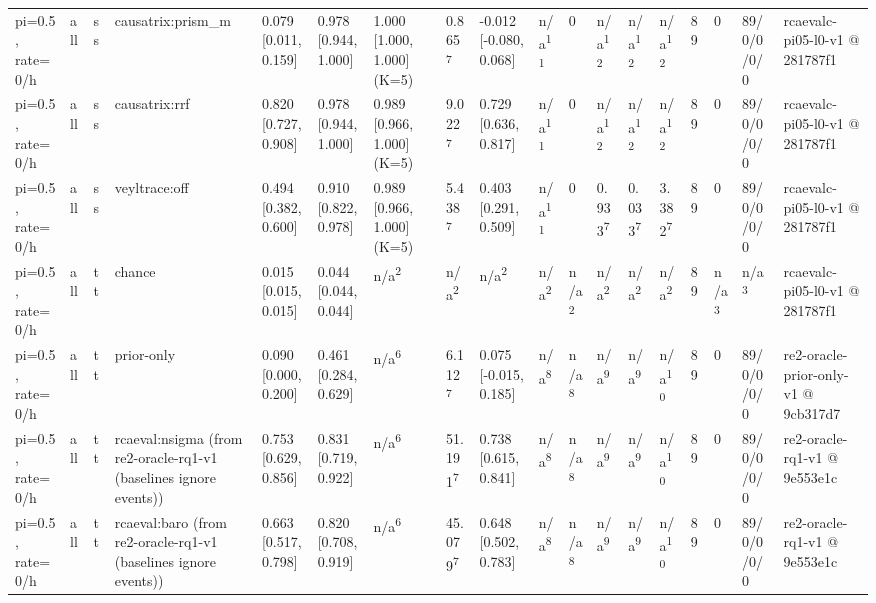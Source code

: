 \begin{table}[t]
\begin{tabular}{llllllllllllllllll}
pi=0.5, rate=0/h & all & ss & causatrix:prism\_m & 0.079 [0.011, 0.159] & 0.978 [0.944, 1.000] & 1.000 [1.000, 1.000] (K=5) & 0.865\textsuperscript{7} & -0.012 [-0.080, 0.068] & n/a\textsuperscript{11} & 0 & n/a\textsuperscript{12} & n/a\textsuperscript{12} & n/a\textsuperscript{12} & 89 & 0 & 89/0/0/0/0 & rcaevalc-pi05-l0-v1 @ 281787f1 \\
pi=0.5, rate=0/h & all & ss & causatrix:rrf & 0.820 [0.727, 0.908] & 0.978 [0.944, 1.000] & 0.989 [0.966, 1.000] (K=5) & 9.022\textsuperscript{7} & 0.729 [0.636, 0.817] & n/a\textsuperscript{11} & 0 & n/a\textsuperscript{12} & n/a\textsuperscript{12} & n/a\textsuperscript{12} & 89 & 0 & 89/0/0/0/0 & rcaevalc-pi05-l0-v1 @ 281787f1 \\
pi=0.5, rate=0/h & all & ss & veyltrace:off & 0.494 [0.382, 0.600] & 0.910 [0.822, 0.978] & 0.989 [0.966, 1.000] (K=5) & 5.438\textsuperscript{7} & 0.403 [0.291, 0.509] & n/a\textsuperscript{11} & 0 & 0.933\textsuperscript{7} & 0.033\textsuperscript{7} & 3.382\textsuperscript{7} & 89 & 0 & 89/0/0/0/0 & rcaevalc-pi05-l0-v1 @ 281787f1 \\
pi=0.5, rate=0/h & all & tt & chance & 0.015 [0.015, 0.015] & 0.044 [0.044, 0.044] & n/a\textsuperscript{2} & n/a\textsuperscript{2} & n/a\textsuperscript{2} & n/a\textsuperscript{2} & n/a\textsuperscript{2} & n/a\textsuperscript{2} & n/a\textsuperscript{2} & n/a\textsuperscript{2} & 89 & n/a\textsuperscript{3} & n/a\textsuperscript{3} & rcaevalc-pi05-l0-v1 @ 281787f1 \\
pi=0.5, rate=0/h & all & tt & prior-only & 0.090 [0.000, 0.200] & 0.461 [0.284, 0.629] & n/a\textsuperscript{6} & 6.112\textsuperscript{7} & 0.075 [-0.015, 0.185] & n/a\textsuperscript{8} & n/a\textsuperscript{8} & n/a\textsuperscript{9} & n/a\textsuperscript{9} & n/a\textsuperscript{10} & 89 & 0 & 89/0/0/0/0 & re2-oracle-prior-only-v1 @ 9cb317d7 \\
pi=0.5, rate=0/h & all & tt & rcaeval:nsigma (from re2-oracle-rq1-v1 (baselines ignore events)) & 0.753 [0.629, 0.856] & 0.831 [0.719, 0.922] & n/a\textsuperscript{6} & 51.191\textsuperscript{7} & 0.738 [0.615, 0.841] & n/a\textsuperscript{8} & n/a\textsuperscript{8} & n/a\textsuperscript{9} & n/a\textsuperscript{9} & n/a\textsuperscript{10} & 89 & 0 & 89/0/0/0/0 & re2-oracle-rq1-v1 @ 9e553e1c \\
pi=0.5, rate=0/h & all & tt & rcaeval:baro (from re2-oracle-rq1-v1 (baselines ignore events)) & 0.663 [0.517, 0.798] & 0.820 [0.708, 0.919] & n/a\textsuperscript{6} & 45.079\textsuperscript{7} & 0.648 [0.502, 0.783] & n/a\textsuperscript{8} & n/a\textsuperscript{8} & n/a\textsuperscript{9} & n/a\textsuperscript{9} & n/a\textsuperscript{10} & 89 & 0 & 89/0/0/0/0 & re2-oracle-rq1-v1 @ 9e553e1c \\

\end{tabular}
\end{table}
